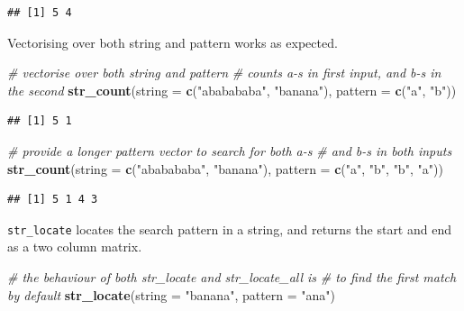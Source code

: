 \documentclass[]{book}
\newenvironment{Shaded}{}{}
\newcommand{\CommentTok}[1]{\textcolor[rgb]{0.38,0.63,0.69}{\textit{#1}}}
\newcommand{\DataTypeTok}[1]{\textcolor[rgb]{0.56,0.13,0.00}{#1}}
\newcommand{\KeywordTok}[1]{\textcolor[rgb]{0.00,0.44,0.13}{\textbf{#1}}}
\newcommand{\NormalTok}[1]{#1}
\newcommand{\StringTok}[1]{\textcolor[rgb]{0.25,0.44,0.63}{#1}}
\begin{document}
\begin{verbatim}
## [1] 5 4
\end{verbatim}

Vectorising over both string and pattern works as expected.

\begin{Shaded}
\begin{Highlighting}[]
\CommentTok{# vectorise over both string and pattern}
\CommentTok{# counts a-s in first input, and b-s in the second}
\KeywordTok{str_count}\NormalTok{(}\DataTypeTok{string =} \KeywordTok{c}\NormalTok{(}\StringTok{"ababababa"}\NormalTok{, }\StringTok{"banana"}\NormalTok{), }
          \DataTypeTok{pattern =} \KeywordTok{c}\NormalTok{(}\StringTok{"a"}\NormalTok{, }\StringTok{"b"}\NormalTok{))}
\end{Highlighting}
\end{Shaded}

\begin{verbatim}
## [1] 5 1
\end{verbatim}

\begin{Shaded}
\begin{Highlighting}[]
\CommentTok{# provide a longer pattern vector to search for both a-s }
\CommentTok{# and b-s in both inputs}
\KeywordTok{str_count}\NormalTok{(}\DataTypeTok{string =} \KeywordTok{c}\NormalTok{(}\StringTok{"ababababa"}\NormalTok{, }\StringTok{"banana"}\NormalTok{), }
         \DataTypeTok{pattern =} \KeywordTok{c}\NormalTok{(}\StringTok{"a"}\NormalTok{, }\StringTok{"b"}\NormalTok{, }
                    \StringTok{"b"}\NormalTok{, }\StringTok{"a"}\NormalTok{))}
\end{Highlighting}
\end{Shaded}

\begin{verbatim}
## [1] 5 1 4 3
\end{verbatim}

\texttt{str\_locate} locates the search pattern in a string, and returns the start and end as a two column matrix.

\begin{Shaded}
\begin{Highlighting}[]
\CommentTok{# the behaviour of both str_locate and str_locate_all is }
\CommentTok{# to find the first match by default}
\KeywordTok{str_locate}\NormalTok{(}\DataTypeTok{string =} \StringTok{"banana"}\NormalTok{, }\DataTypeTok{pattern =} \StringTok{"ana"}\NormalTok{)}
\end{Highlighting}
\end{Shaded}
\end{document}
